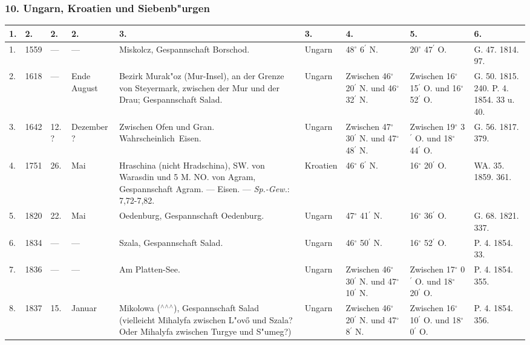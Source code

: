 \documentclass[a4paper, 8pt, oneside, polutonikogreek, german]{article}
\begin{document}
\subsubsection{10. Ungarn, Kroatien und Siebenb"urgen}
\begin{center}
    \footnotesize
    \begin{longtable}{|p{3mm}|p{5mm}|p{5mm}|p{13mm}|p{25mm}|p{16mm}|p{10mm}|p{10mm}|p{11mm}|}
    \hline
        1. & 2. & 2. & 2. & 3. & 3. & 4. & 5. & 6. \\ \hline
        1. & 1559 & --- & --- & Miskolcz, Gespannschaft Borschod. & Ungarn & 48$^\circ$ 6$^\prime$ N. & 20$^\circ$ 47$^\prime$ O. & G. 47. 1814. 97. \\ \hline
        2. & 1618 & --- & Ende August & Bezirk Murak"oz (Mur-Insel), an der Grenze von Steyermark, zwischen der Mur und der Drau; Gespannschaft Salad. & Ungarn & Zwischen 46$^\circ$ 20$^\prime$ N. und 46$^\circ$ 32$^\prime$ N. & Zwischen 16$^\circ$ 15$^\prime$ O. und 16$^\circ$ 52$^\prime$ O. & G. 50. 1815. 240. P. 4. 1854. 33 u. 40. \\ \hline
        3. & 1642 & 12. ? & Dezember ? & Zwischen Ofen und Gran. Wahrscheinlich Eisen. & Ungarn & Zwischen 47$^\circ$ 30$^\prime$ N. und 47$^\circ$ 48$^\prime$ N. & Zwischen 19$^\circ$ 3$^\prime$ O. und 18$^\circ$ 44$^\prime$ O. & G. 56. 1817. 379. \\ \hline
        4. & 1751 & 26. & Mai & Hraschina (nicht Hradschina), SW. von Warasdin und 5 M. NO. von Agram, Gespannschaft Agram. --- Eisen. --- \emph{Sp.-Gew.}: 7,72-7,82. & Kroatien & 46$^\circ$ 6$^\prime$ N. & 16$^\circ$ 20$^\prime$ O. & WA. 35. 1859. 361. \\ \hline
        5. & 1820 & 22. & Mai & Oedenburg, Gespannschaft Oedenburg. & Ungarn & 47$^\circ$ 41$^\prime$ N. & 16$^\circ$ 36$^\prime$ O. & G. 68. 1821. 337. \\ \hline
        6. & 1834 & --- & --- & Szala, Gespannschaft Salad. & Ungarn & 46$^\circ$ 50$^\prime$ N. & 16$^\circ$ 52$^\prime$ O. & P. 4. 1854. 33. \\ \hline
        7. & 1836 & --- & --- & Am Platten-See. & Ungarn & Zwischen 46$^\circ$ 30$^\prime$ N. und 47$^\circ$ 10$^\prime$ N. & Zwischen 17$^\circ$ 0$^\prime$ O. und 18$^\circ$ 20$^\prime$ O. & P. 4. 1854. 355. \\ \hline
        8. & 1837 & 15. & Januar & Mikolowa ($^\wedge$$^\wedge$$^\wedge$), Gespannschaft Salad (vielleicht Mihalyfa zwischen L"ovő und Szala? Oder Mihalyfa zwischen Turgye und S"umeg?) & Ungarn & Zwischen 46$^\circ$ 20$^\prime$ N. und 47$^\circ$ 8$^\prime$ N. & Zwischen 16$^\circ$ 10$^\prime$ O. und 18$^\circ$ 0$^\prime$ O. & P. 4. 1854. 356. \\ \hline

\end{longtable}
\end{center}
\end{document}
